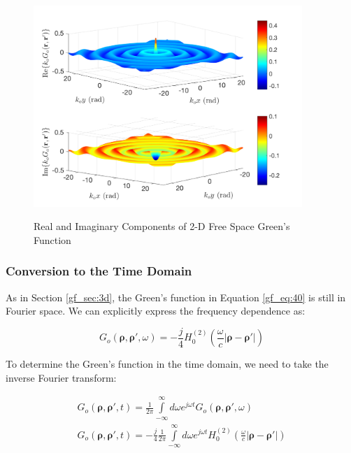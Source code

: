 \begin{figure}[ht]
\begin{center}
\includegraphics[width=4in]{../media/2d_fs_gf_re_im.png}
\end{center}
\renewcommand{\baselinestretch}{1}
\small\normalsize
\begin{quote}
\caption[Real and Imaginary Components of 2-D Free Space Green's Function]{Real and Imaginary Components of 2-D Free Space Green's Function \label{gf_fig:4}}
\end{quote}
\end{figure} 
\renewcommand{\baselinestretch}{2}
\small\normalsize

\subsubsection {Conversion to the Time Domain}
As in Section \ref{gf_sec:3d}, the Green's function in Equation \ref{gf_eq:40} is still in Fourier space. We can explicitly express the frequency dependence as:

\begin{equation}
G_o\left(\boldsymbol{\rho},\boldsymbol{\rho}',\omega\right) = -\frac{j}{4}H_0^{(2)}\left(\frac{\omega}{c}|\boldsymbol{\rho} - \boldsymbol{\rho}' | \right)
\label{gf_eq:40a}
\end{equation}
\renewcommand{\baselinestretch}{2} \small\normalsize

To determine the Green's function in the time domain, we need to take the inverse Fourier transform:

\begin{equation}
\begin{gathered}
G_o\left(\boldsymbol{\rho},\boldsymbol{\rho}',t\right) = \frac{1}{2\pi}\int\limits_{-\infty}^{\infty}d\omega e^{j\omega t}G_o\left(\boldsymbol{\rho},\boldsymbol{\rho}',\omega\right) \\
G_o\left(\boldsymbol{\rho},\boldsymbol{\rho}',t\right) = -\frac{j}{4}\frac{1}{2\pi}\int\limits_{-\infty}^{\infty}d\omega e^{j\omega t} H_0^{(2)}\left(\frac{\omega}{c}|\boldsymbol{\rho} - \boldsymbol{\rho}' | \right)\\
\end{gathered}
\label{gf_eq:40b}
\end{equation}
\renewcommand{\baselinestretch}{2} \small\normalsize

